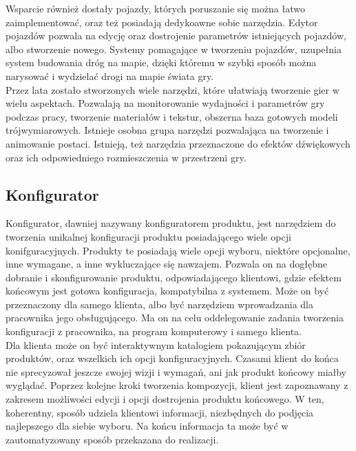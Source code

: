 \documentclass{article} %
\begin{document}
        Wsparcie również dostały pojazdy, których poruszanie się można łatwo zaimplementować, oraz też posiadają dedykoawne sobie narzędzia. Edytor pojazdów pozwala na edycję oraz dostrojenie parametrów istniejących pojazdów, albo stworzenie nowego. Systemy pomagające w tworzeniu pojazdów, uzupełnia system budowania dróg na mapie, dzięki któremu w szybki sposób można narysować i wydzielać drogi na mapie świata gry.
        \\
        
        Przez lata zostało stworzonych wiele narzędzi, które ułatwiają tworzenie gier w wielu aspektach. Pozwalają na monitorowanie wydajności i parametrów gry podczas pracy, tworzenie materiałów i tekstur, obszerna baza gotowych modeli trójwymiarowych. Istnieje osobna grupa narzędzi pozwalająca na tworzenie i animowanie postaci. Istnieją, też narzędzia przeznaczone do efektów dźwiękowych oraz ich odpowiedniego rozmieszczenia w przestrzeni gry.
        \\
        
        
        
    \subsection{Konfigurator}
        Konfigurator, dawniej nazywany konfiguratorem produktu, jest narzędziem do tworzenia unikalnej konfiguracji produktu posiadającego wiele opcji konifguracyjnych. Produkty te posiadają wiele opcji wyboru, niektóre opcjonalne, inne wymagane, a inne wykluczające się nawzajem. Pozwala on na dogłębne dobranie i skonfigurowanie produktu, odpowiadającego klientowi, gdzie efektem końcowym jest gotowa konfiguracja, kompatybilna z systemem. Może on być przeznaczony dla samego klienta, albo być narzędziem wprowadzania dla pracownika jego obsługującego. Ma on na celu oddelegowanie zadania tworzenia konfiguracji z pracownika, na program komputerowy i samego klienta.
        \\
        
        Dla klienta może on być interaktywnym katalogiem pokazującym zbiór produktów, oraz wszelkich ich opcji konfiguracyjnych. Czasami klient do końca nie sprecyzował jeszcze swojej wizji i wymagań, ani jak produkt końcowy miałby wyglądać. Poprzez kolejne kroki tworzenia kompozycji, klient jest zapoznawany z zakresem możliwości edycji i opcji dostrojenia produktu końcowego. W ten, koherentny, sposób udziela klientowi informacji, niezbędnych do podjęcia najlepszego dla siebie wyboru. Na końcu informacja ta może być w zautomatyzowany sposób przekazana do realizacji.
        \\
        
\end{document}
